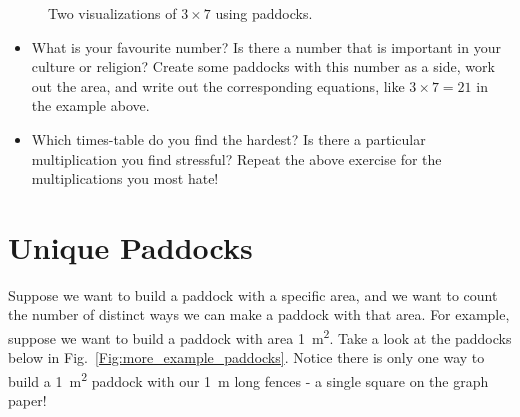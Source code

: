 \documentclass{article}
\begin{document}
\begin{figure}[ht]
    \centering
    \caption{Two visualizations of $3\times 7$ using paddocks.}
    \label{Fig:three_by_seven}
\end{figure}

\begin{itemize}
\item
What is your favourite number? Is there a number that is important in your culture or religion? Create some paddocks with this number as a side, work out the area, and write out the corresponding equations, like $3\times 7 =21$ in the example above.
\item
Which times-table do you find the hardest? Is there a particular multiplication you find stressful? Repeat the above exercise for the multiplications you most hate!
\end{itemize}

\section{Unique Paddocks}
Suppose we want to build a paddock with a specific area, and we want to count the number of distinct ways we can make a paddock with that area. For example, suppose we want to build a paddock with area \SI{1}{\meter\squared}. Take a look at the paddocks below in Fig.~\ref{Fig:more_example_paddocks}. Notice there is only one way to build a \SI{1}{\meter\squared} paddock with our \SI{1}{\meter} long fences - a single square on the graph paper!
\end{document}
